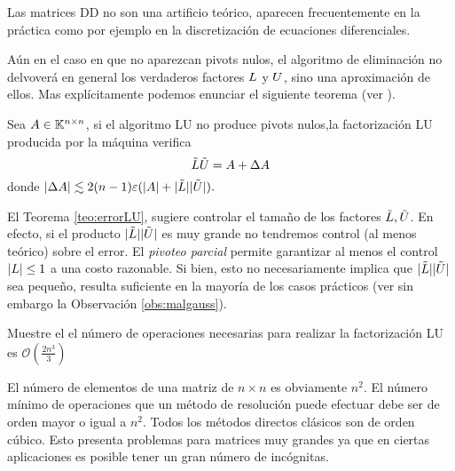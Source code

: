 \begin{tcolorbox}
\begin{observacion}
 Las matrices DD no son una artificio teórico, aparecen frecuentemente en la práctica como por ejemplo en la  discretización de ecuaciones diferenciales.
\end{observacion}
\etcc

Aún en el caso en que no aparezcan pivots nulos, el algoritmo de eliminación no delvoverá en general los verdaderos factores $\Lb$ y $\Ub$, sino una aproximación de ellos. Mas explícitamente podemos enunciar el siguiente teorema (ver \cite{TB}).
\begin{tcolorbox}
[colback=black!15!white,colframe=black!75!black]
\begin{teorema}\label{teo:errorLU}
 Sea $\Ab\in \Knn$,   si el algoritmo LU no produce pivots nulos,la factorización LU producida por la máquina verifica
 $$
 \tilde\Lb\tilde \Ub= \Ab + \Delta \Ab
 $$
donde $|\Delta\Ab|\lesssim 2(n-1)\varepsilon(| \Ab|+|\tilde \Lb||\tilde \Ub|).
$
\end{teorema}

\end{tcolorbox}


\begin{tcolorbox}
\begin{observacion}
 El Teorema \ref{teo:errorLU}, sugiere controlar el tamaño de los factores
$\tilde\Lb,\tilde\Ub$. En efecto, si el producto
$|\tilde \Lb||\tilde \Ub|$ es muy grande no tendremos control (al menos teórico) sobre el error. El \emph{pivoteo parcial} permite garantizar al menos el control $|\Lb|\le 1$ a una costo razonable. Si bien, esto no necesariamente implica que $|\tilde \Lb||\tilde \Ub|$ sea pequeño, resulta suficiente en la mayoría de los casos prácticos (ver sin embargo la Observación \ref{obs:malgauss}).

\end{observacion}

\end{tcolorbox}


\begin{ejercicio}
 Muestre el el número de operaciones necesarias para realizar la factorización LU es $\mathcal{O} (\frac{2n^3}{3})$
\end{ejercicio}


El número de elementos de una matriz de $n\times n$ es obviamente $n^2$. El número mínimo de operaciones que un método de resolución puede efectuar debe ser de orden mayor o igual a $n^2$. Todos los métodos directos clásicos son de orden cúbico. Esto presenta problemas para matrices muy grandes ya que en ciertas aplicaciones es posible tener un gran número de incógnitas.


\end{tcolorbox}

